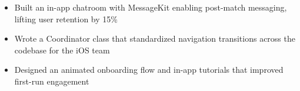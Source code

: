 \begin{itemize}
    \item Built an in-app chatroom with MessageKit enabling post-match messaging, lifting user retention by 15\%
    \item Wrote a Coordinator class that standardized navigation transitions across the codebase for the iOS team
    \item Designed an animated onboarding flow and in-app tutorials that improved first-run engagement
\end{itemize}
